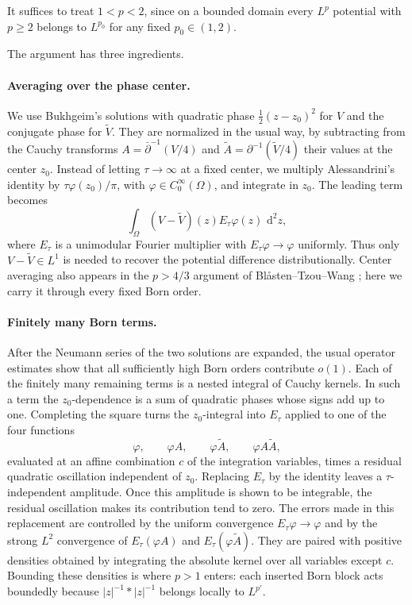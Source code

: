 \documentclass[a4paper,11pt]{article}
\newcommand{\dd}{\,\text{d}}
\theoremstyle{plain}
\theoremstyle{definition}
\theoremstyle{remark}
\begin{document}
It suffices to treat $1<p<2$, since on a bounded domain every $L^p$ potential with $p\geq2$ belongs to $L^{p_0}$ for any fixed $p_0\in(1,2)$.

The argument has three ingredients.

\paragraph{Averaging over the phase center.}
We use Bukhgeim's solutions with quadratic phase $\tfrac12(z-z_0)^2$ for $V$ and the conjugate phase for $\widetilde V$. They are normalized in the usual way, by subtracting from the Cauchy transforms $A=\bar\partial^{-1}(V/4)$ and $\widetilde A=\partial^{-1}(\widetilde V/4)$ their values at the center $z_0$. Instead of letting $\tau\to\infty$ at a fixed center, we multiply Alessandrini's identity by $\tau\varphi(z_0)/\pi$, with $\varphi\in C_0^\infty(\Omega)$, and integrate in $z_0$. The leading term becomes
\[
 \int_\Omega (V-\widetilde V)(z)E_\tau\varphi(z)\,\dd^2z,
\]
where $E_\tau$ is a unimodular Fourier multiplier with $E_\tau\varphi\to\varphi$ uniformly. Thus only $V-\widetilde V\in L^1$ is needed to recover the potential difference distributionally. Center averaging also appears in the $p>4/3$ argument of Bl\r{a}sten--Tzou--Wang \cite{BlastenTzouWang2020}; here we carry it through every fixed Born order.

\paragraph{Finitely many Born terms.}
After the Neumann series of the two solutions are expanded, the usual operator estimates show that all sufficiently high Born orders contribute $o(1)$. Each of the finitely many remaining terms is a nested integral of Cauchy kernels. In such a term the $z_0$-dependence is a sum of quadratic phases whose signs add up to one. Completing the square turns the $z_0$-integral into $E_\tau$ applied to one of the four functions
\[
 \varphi,\qquad \varphi A,\qquad \varphi\widetilde A,
 \qquad \varphi A\widetilde A,
\]
evaluated at an affine combination $c$ of the integration variables, times a residual quadratic oscillation independent of $z_0$. Replacing $E_\tau$ by the identity leaves a $\tau$-independent amplitude. Once this amplitude is shown to be integrable, the residual oscillation makes its contribution tend to zero. The errors made in this replacement are controlled by the uniform convergence $E_\tau\varphi\to\varphi$ and by the strong $L^2$ convergence of $E_\tau(\varphi A)$ and $E_\tau(\varphi\widetilde A)$. They are paired with positive densities obtained by integrating the absolute kernel over all variables except $c$. Bounding these densities is where $p>1$ enters: each inserted Born block acts boundedly because $|z|^{-1}*|z|^{-1}$ belongs locally to $L^{p'}$.
\end{document}
